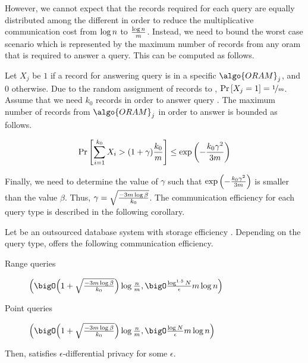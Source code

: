 		However, we cannot expect that the records required for each query are equally distributed among the different  in order to reduce the multiplicative communication cost from $\log n$ to $\frac{\log n}{m}$.
		Instead, we need to bound the worst case scenario which is represented by the maximum number of records from any \acrshort{oram} that is required to answer a query.
		This can be computed as follows.

		Let $X_j$ be $1$ if a record for answering query \query{} is in a specific $\algo{ORAM}_j$, and $0$ otherwise.
		Due to the random assignment of records to , $\textnormal{Pr}\left[ X_j = 1 \right] = \nicefrac{1}{m}$.
		Assume that we need $k_0$ records in order to answer query \query{}.
		The maximum number of records from $\algo{ORAM}_j$ in order to answer \query{} is bounded as follows.

		\begin{equation}\label{equation:gamma}
			\probability{ \sum_{i=1}^{k_0} X_i > ( 1 + \gamma ) \frac{k_0}{\oramsNumber} } \leq \exp{ \left( - \frac{ k_0 \gamma^2 }{ 3 \oramsNumber } \right) }
		\end{equation}

		Finally, we need to determine the value of $\gamma$ such that $\exp{ \left( - \frac{ k_0 \gamma^2 }{ 3 \ensuremath{m}} \right) }$ is smaller than the value $\beta$.
		Thus, $\gamma = \sqrt{ \frac{-3 m \log \beta}{ k_0 } }$.
		The communication efficiency for each query type is described in the following corollary.

		\begin{corollary}\label{corollary:no-gamma}
			Let \protocolNoGamma{} be an outsourced database system with storage efficiency .
			Depending on the query type, \protocolNoGamma{} offers the following communication efficiency.
			\begin{description}
				\item[Range queries] $\efficiency{\left( 1 + \sqrt{ \frac{- 3 \oramsNumber \log \beta}{k_0} } \right) \log \frac{\dataSize}{\oramsNumber} }{ \frac{ \log^{1.5} \domainSize}{ \epsilon } \oramsNumber \log \dataSize }$
				\item[Point queries] $\efficiency{\left( 1 + \sqrt{ \frac{- 3 \oramsNumber \log \beta}{k_0} } \right) \log \frac{\dataSize}{\oramsNumber} }{ \frac{ \log \domainSize}{ \epsilon } \oramsNumber \log \dataSize }$
			\end{description}

			Then, \protocolNoGamma{} satisfies $\epsilon$-differential privacy for some $\epsilon$.
		\end{corollary}

